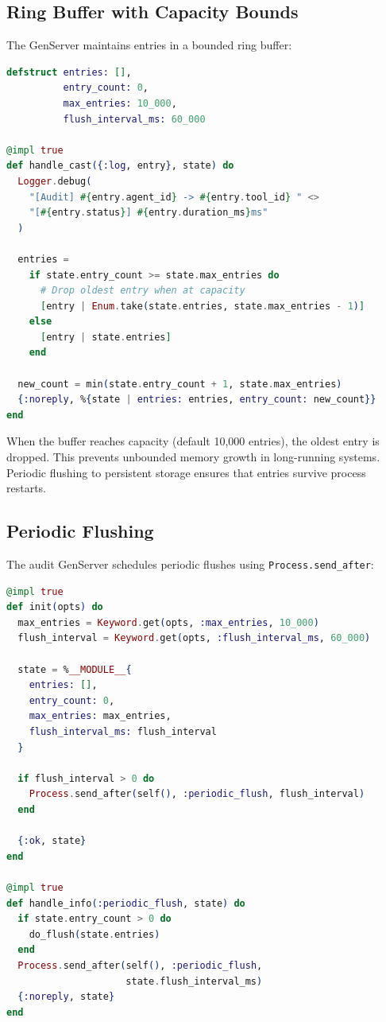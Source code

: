 \documentclass[12pt,a4paper]{article}
\theoremstyle{plain}
\theoremstyle{definition}
\begin{document}
\subsection{Ring Buffer with Capacity Bounds}

The GenServer maintains entries in a bounded ring buffer:

\begin{lstlisting}[language=elixir, caption={Ring buffer entry storage with capacity bounds.}, label={lst:ring-buffer}]
defstruct entries: [],
          entry_count: 0,
          max_entries: 10_000,
          flush_interval_ms: 60_000

@impl true
def handle_cast({:log, entry}, state) do
  Logger.debug(
    "[Audit] #{entry.agent_id} -> #{entry.tool_id} " <>
    "[#{entry.status}] #{entry.duration_ms}ms"
  )

  entries =
    if state.entry_count >= state.max_entries do
      # Drop oldest entry when at capacity
      [entry | Enum.take(state.entries, state.max_entries - 1)]
    else
      [entry | state.entries]
    end

  new_count = min(state.entry_count + 1, state.max_entries)
  {:noreply, %{state | entries: entries, entry_count: new_count}}
end
\end{lstlisting}

When the buffer reaches capacity (default 10,000 entries), the oldest entry is dropped. This prevents unbounded memory growth in long-running systems. Periodic flushing to persistent storage ensures that entries survive process restarts.

\subsection{Periodic Flushing}

The audit GenServer schedules periodic flushes using \texttt{Process.send\_after}:

\begin{lstlisting}[language=elixir, caption={Periodic flush scheduling.}, label={lst:flush}]
@impl true
def init(opts) do
  max_entries = Keyword.get(opts, :max_entries, 10_000)
  flush_interval = Keyword.get(opts, :flush_interval_ms, 60_000)

  state = %__MODULE__{
    entries: [],
    entry_count: 0,
    max_entries: max_entries,
    flush_interval_ms: flush_interval
  }

  if flush_interval > 0 do
    Process.send_after(self(), :periodic_flush, flush_interval)
  end

  {:ok, state}
end

@impl true
def handle_info(:periodic_flush, state) do
  if state.entry_count > 0 do
    do_flush(state.entries)
  end
  Process.send_after(self(), :periodic_flush,
                     state.flush_interval_ms)
  {:noreply, state}
end
\end{lstlisting}
\end{document}
